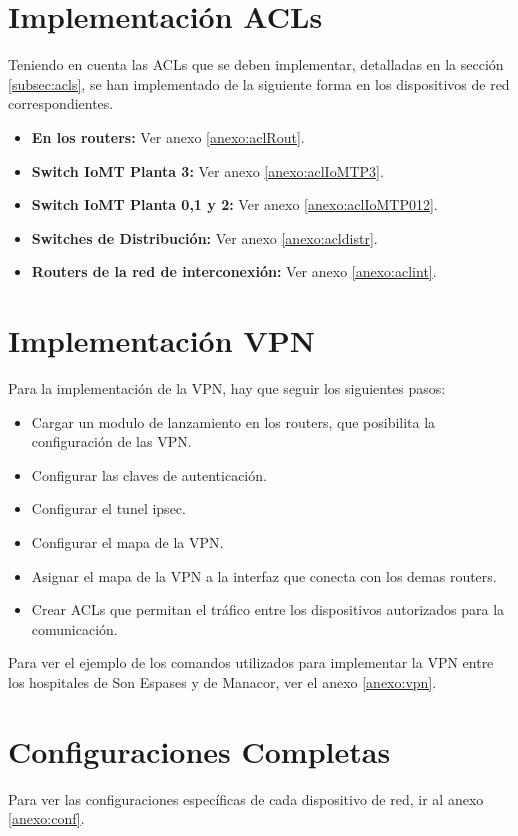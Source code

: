 \section{Implementación ACLs}
Teniendo en cuenta las ACLs que se deben implementar, detalladas en la sección \ref{subsec:acls}, se han implementado de la siguiente forma en los dispositivos de red correspondientes.
\begin{itemize}
    \item \textbf{En los routers:} Ver anexo \ref{anexo:aclRout}.
    \item \textbf{Switch IoMT Planta 3:} Ver anexo \ref{anexo:aclIoMTP3}.
    \item \textbf{Switch IoMT Planta 0,1 y 2:} Ver anexo \ref{anexo:aclIoMTP012}.
    \item \textbf{Switches de Distribución:} Ver anexo \ref{anexo:acldistr}.
    \item \textbf{Routers de la red de interconexión:} Ver anexo \ref{anexo:aclint}.
\end{itemize}

\section{Implementación VPN}
Para la implementación de la VPN, hay que seguir los siguientes pasos:
\begin{itemize}
    \item Cargar un modulo de lanzamiento en los routers, que posibilita la configuración de las VPN.
    \item Configurar las claves de autenticación.
    \item Configurar el tunel ipsec.
    \item Configurar el mapa de la VPN.
    \item Asignar el mapa de la VPN a la interfaz que conecta con los demas routers.
    \item Crear ACLs que permitan el tráfico entre los dispositivos autorizados para la comunicación.
\end{itemize}

Para ver el ejemplo de los comandos utilizados para implementar la VPN entre los hospitales de Son Espases y de Manacor, ver el anexo \ref{anexo:vpn}.

\section{Configuraciones Completas}
Para ver las configuraciones específicas de cada dispositivo de red, ir al anexo \ref{anexo:conf}.